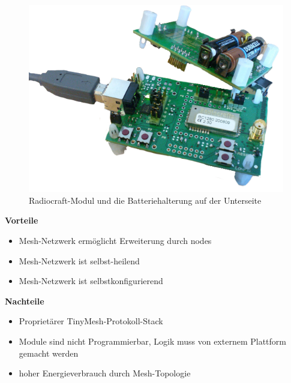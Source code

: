 \begin{figure}[H]
     \centering
        \includegraphics[scale=0.5]{pictures/TinyMesh.png}
    \caption{Radiocraft-Modul und die Batteriehalterung auf der Unterseite}
    \label{fig:TinyMesh}
\end{figure}

\textbf{Vorteile}
\begin{itemize}
\item Mesh-Netzwerk ermöglicht Erweiterung durch nodes
\item Mesh-Netzwerk ist selbst-heilend
\item Mesh-Netzwerk ist selbstkonfigurierend
\end{itemize}
\textbf{Nachteile}
\begin{itemize}
\item Proprietärer TinyMesh-Protokoll-Stack
\item Module sind nicht Programmierbar, Logik muss von externem Plattform gemacht werden
\item hoher Energieverbrauch durch Mesh-Topologie
\end{itemize}

\newpage

